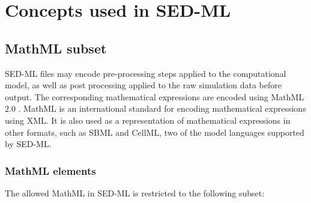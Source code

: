 \pagebreak
\section{Concepts used in SED-ML}
\subsection{MathML subset}
\label{sec:mathML}
SED-ML files may encode pre-processing steps applied to the computational model, as well as post processing applied to the raw simulation data before output. The corresponding mathematical expressions are encoded using MathML 2.0 \citep{CIM+01}. MathML is an international standard for encoding mathematical expressions using XML. It is also used as a representation of mathematical expressions in other formats, such as SBML and CellML, two of the model languages supported by SED-ML. 

\subsubsection{MathML elements}
The allowed MathML in SED-ML is restricted to the following subset: 


